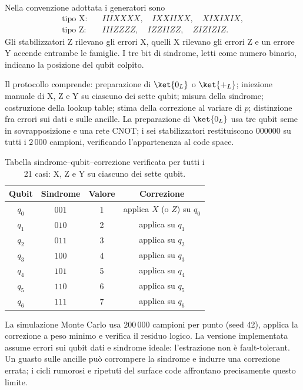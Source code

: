 \begin{onehalfspace}
Nella convenzione adottata i generatori sono
\begin{equation}
\begin{aligned}
\text{tipo X:}\quad & IIIXXXX,\quad IXXIIXX,\quad XIXIXIX,\\
\text{tipo Z:}\quad & IIIZZZZ,\quad IZZIIZZ,\quad ZIZIZIZ.
\end{aligned}
\label{eq:steane_stabilizzatori}
\end{equation}
Gli stabilizzatori Z rilevano gli errori X, quelli X rilevano gli errori
Z e un errore Y accende entrambe le famiglie. I tre bit di sindrome,
letti come numero binario, indicano la posizione del qubit colpito.

Il protocollo comprende: preparazione di $\ket{0_L}$ o $\ket{+_L}$;
iniezione manuale di X, Z e Y su ciascuno dei sette qubit; misura della
sindrome; costruzione della lookup table; stima della correzione al
variare di $p$; distinzione fra errori sui dati e sulle ancille. La
preparazione di $\ket{0_L}$ usa tre qubit seme in sovrapposizione e una
rete CNOT; i sei stabilizzatori restituiscono $000000$ su tutti i
$2\,000$ campioni, verificando l'appartenenza al code space.

\begin{table}[H]
\centering
\begin{tabular}{cccc}
\toprule
\textbf{Qubit} & \textbf{Sindrome} & \textbf{Valore} & \textbf{Correzione} \\
\midrule
$q_0$ & $001$ & 1 & applica $X$ (o $Z$) su $q_0$ \\
$q_1$ & $010$ & 2 & applica su $q_1$ \\
$q_2$ & $011$ & 3 & applica su $q_2$ \\
$q_3$ & $100$ & 4 & applica su $q_3$ \\
$q_4$ & $101$ & 5 & applica su $q_4$ \\
$q_5$ & $110$ & 6 & applica su $q_5$ \\
$q_6$ & $111$ & 7 & applica su $q_6$ \\
\bottomrule
\end{tabular}
\caption[Syndrome table del codice di Steane]{Tabella
sindrome--qubit--correzione verificata per tutti i 21 casi: X, Z e Y su
ciascuno dei sette qubit.}
\label{tab:steane_sindrome}
\end{table}

La simulazione Monte Carlo usa $200\,000$ campioni per punto (seed 42),
applica la correzione a peso minimo e verifica il residuo logico. La
versione implementata assume errori sui qubit dati e sindrome ideale:
l'estrazione non è fault-tolerant. Un guasto sulle ancille può corrompere
la sindrome e indurre una correzione errata; i cicli rumorosi e ripetuti
del surface code affrontano precisamente questo limite.

\end{onehalfspace}
